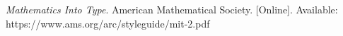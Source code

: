 \documentclass[journal,9pt]{IEEEtran}
\begin{document}

\begin{thebibliography}{1}
  

  {\it{Mathematics Into Type}}. American Mathematical Society. [Online]. Available: https://www.ams.org/arc/styleguide/mit-2.pdf









\end{thebibliography}

\vfill
\end{document}
